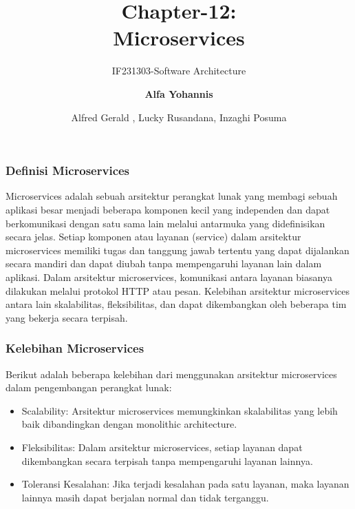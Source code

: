 \documentclass[aspectratio=169, table]{beamer}
\subtitle{IF231303-Software Architecture}
\author[Pradita]{\small {\textbf{Alfa Yohannis}}}
\title{\huge Chapter-12:\\Microservices}
\author{Alfred Gerald , Lucky Rusandana, Inzaghi Posuma }
\begin{document}
	\frame{\titlepage}

	\begin{frame}
		\frametitle{Definisi Microservices}
		Microservices adalah sebuah arsitektur perangkat lunak yang membagi sebuah aplikasi besar menjadi beberapa komponen kecil yang independen dan dapat berkomunikasi dengan satu sama lain melalui antarmuka yang didefinisikan secara jelas. Setiap komponen atau layanan (service) dalam arsitektur microservices memiliki tugas dan tanggung jawab tertentu yang dapat dijalankan secara mandiri dan dapat diubah tanpa mempengaruhi layanan lain dalam aplikasi. Dalam arsitektur microservices, komunikasi antara layanan biasanya dilakukan melalui protokol HTTP atau pesan. Kelebihan arsitektur microservices antara lain skalabilitas, fleksibilitas, dan dapat dikembangkan oleh beberapa tim yang bekerja secara terpisah.
	\end{frame}


	\begin{frame}
		\frametitle{Kelebihan Microservices}
		Berikut adalah beberapa kelebihan dari menggunakan arsitektur microservices dalam pengembangan perangkat lunak:
		\begin{itemize}
			\item Scalability: Arsitektur microservices memungkinkan skalabilitas yang lebih baik dibandingkan dengan monolithic architecture.
		\item Fleksibilitas: Dalam arsitektur microservices, setiap layanan dapat dikembangkan secara terpisah tanpa mempengaruhi layanan lainnya.
		\item Toleransi Kesalahan: Jika terjadi kesalahan pada satu layanan, maka layanan lainnya masih dapat berjalan normal dan tidak terganggu.
		\end{itemize}
	\end{frame}
\end{document}
